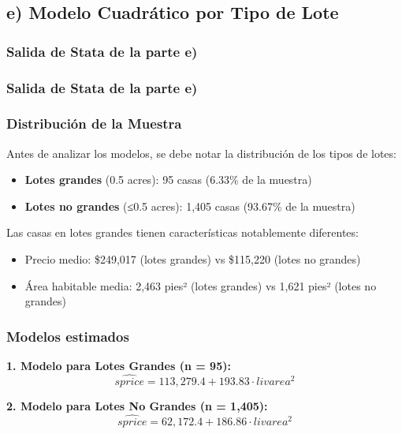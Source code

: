 \documentclass[12pt]{article}
\begin{document}
\subsection*{e) Modelo Cuadrático por Tipo de Lote}

\subsubsection*{Salida de Stata de la parte e)}

\subsubsection*{Salida de Stata de la parte e)}



\subsubsection*{Distribución de la Muestra}

Antes de analizar los modelos, se debe notar la distribución de los tipos de lotes:
\begin{itemize}
    \item \textbf{Lotes grandes} (0.5 acres): 95 casas (6.33\% de la muestra)
    \item \textbf{Lotes no grandes} (≤0.5 acres): 1,405 casas (93.67\% de la muestra)
\end{itemize}

Las casas en lotes grandes tienen características notablemente diferentes:
\begin{itemize}
    \item Precio medio: \$249,017 (lotes grandes) vs \$115,220 (lotes no grandes)
    \item Área habitable media: 2,463 pies² (lotes grandes) vs 1,621 pies² (lotes no grandes)
\end{itemize}

\subsubsection*{Modelos estimados}

\textbf{1. Modelo para Lotes Grandes (n = 95):}
\[
\widehat{sprice} = 113,279.4 + 193.83 \cdot livarea^2
\]

\textbf{2. Modelo para Lotes No Grandes (n = 1,405):}
\[
\widehat{sprice} = 62,172.4 + 186.86 \cdot livarea^2
\]
\end{document}
